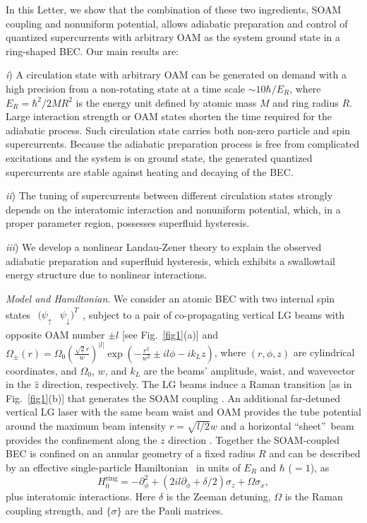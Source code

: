 \documentclass[twocolumn,prl,floatfix,citeautoscript,nofootinbib]{revtex4-1}
\begin{document}
In this Letter, we show that the combination of these two ingredients, SOAM
coupling and nonuniform potential, allows adiabatic preparation and control
of quantized supercurrents with arbitrary OAM as the system ground state in
a ring-shaped BEC. Our main results are:

\textit{i}) A circulation state with arbitrary OAM can be generated on
demand with a high precision from a non-rotating state at a time scale $\sim
10\hbar /E_{R}$, where $E_{R}=\hbar ^{2}/2MR^{2}$ is the energy unit defined
by atomic mass $M$ and ring radius $R$. Large interaction strength or OAM
states shorten the time required for the adiabatic process. Such circulation
state carries both non-zero particle and spin supercurrents. Because the
adiabatic preparation process is free from complicated excitations and the
system is on ground state, the generated quantized supercurrents are stable
against heating and decaying of the BEC.

\textit{ii}) The tuning of supercurrents between different circulation
states strongly depends on the interatomic interaction and nonuniform
potential, which, in a proper parameter region, possesses superfluid
hysteresis.

\textit{iii}) We develop a nonlinear Landau-Zener theory to explain the
observed adiabatic preparation and superfluid hysteresis, which exhibits a
swallowtail energy structure due to nonlinear interactions.


\emph{Model and Hamiltonian}. We consider an atomic BEC with two internal
spin states $%
\begin{array}{cc}
{({\psi _{\uparrow }}} & {{\psi _{\downarrow }}{)^{T}}}%
\end{array}%
$, subject to a pair of co-propagating vertical LG beams with opposite OAM
number $\pm l$ [see Fig.~\ref{fig1}(a)] and $\Omega _{\pm }(r)=\Omega
_{0}\left( \frac{\sqrt{2}r}{w}\right) ^{|l|}\exp \left( -\frac{r^{2}}{w^{2}}%
\pm il\phi -ik_{L}z\right) $, where $(r,\phi ,z)$ are cylindrical
coordinates, and $\Omega _{0}$, $w$, and $k_{L}$ are the beams' amplitude,
waist, and wavevector in the $\hat{z}$ direction, respectively. The LG beams
induce a Raman transition [as in Fig.~\ref{fig1}(b)] that generates the SOAM
coupling \cite{Sun2015,DeMarco2015,Qu2015}. An additional far-detuned
vertical LG laser with the same beam waist and OAM provides the tube
potential around the maximum beam intensity $r=\sqrt{l/2}w$ and a horizontal
\textquotedblleft sheet\textquotedblright\ beam provides the confinement
along the $z$ direction \cite{Beattie2013}. Together the SOAM-coupled BEC is
confined on an annular geometry of a fixed radius $R$ and can be described
by an effective single-particle Hamiltonian~\cite{Sun2015} in units of $E_{R}
$ and $\hbar $ ($=1$), as
\begin{equation}
H_{0}^{\mathrm{ring}}=-\partial _{\phi }^{2}+\left( 2il\partial _{\phi
}+\delta /2\right) \sigma _{z}+\Omega \sigma _{x},
\end{equation}%
plus interatomic interactions. Here $\delta $ is the Zeeman detuning, $%
\Omega $ is the Raman coupling strength, and $\{\sigma \}$ are the Pauli
matrices.
\end{document}
